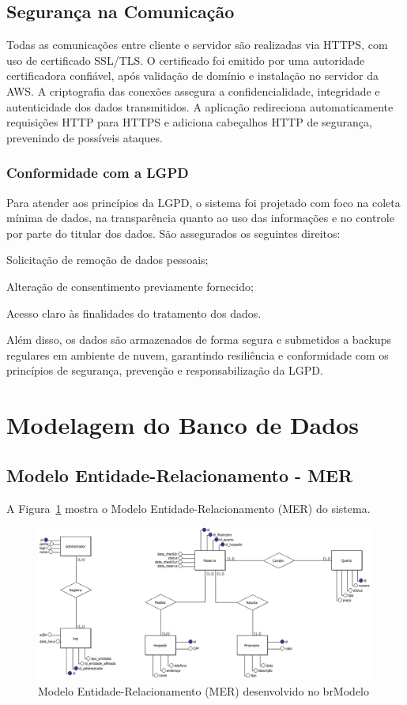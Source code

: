 \documentclass[
	12pt,				%
	openany,			%
	twoside,			%
	a4paper,			%
	english,			%
	french,				%
	spanish,			%
	brazil				%
	]{abntex2}
\begin{document}
\subsection{Segurança na Comunicação}

Todas as comunicações entre cliente e servidor são realizadas via HTTPS, com uso de certificado SSL/TLS. O certificado foi emitido por uma autoridade certificadora confiável, após validação de domínio e instalação no servidor da AWS. A criptografia das conexões assegura a confidencialidade, integridade e autenticidade dos dados transmitidos.
A aplicação redireciona automaticamente requisições HTTP para HTTPS e adiciona cabeçalhos HTTP de segurança, prevenindo de possíveis ataques.


\subsubsection{Conformidade com a LGPD}
Para atender aos princípios da LGPD, o sistema foi projetado com foco na coleta mínima de dados, na transparência quanto ao uso das informações e no controle por parte do titular dos dados. São assegurados os seguintes direitos:

Solicitação de remoção de dados pessoais;

Alteração de consentimento previamente fornecido;

Acesso claro às finalidades do tratamento dos dados.

Além disso, os dados são armazenados de forma segura e submetidos a backups regulares em ambiente de nuvem, garantindo resiliência e conformidade com os princípios de segurança, prevenção e responsabilização da LGPD.


\section{Modelagem do Banco de Dados}
\subsection{Modelo Entidade-Relacionamento - MER}

A Figura~\ref{fig:mer} mostra o Modelo Entidade-Relacionamento (MER) do sistema.

\begin{figure}[h!]
	\centering
	\includegraphics[width=\textwidth]{0406-MER.jpg}
	\caption{Modelo Entidade-Relacionamento (MER) desenvolvido no brModelo}
	\label{fig:mer}
\end{figure}
\end{document}
